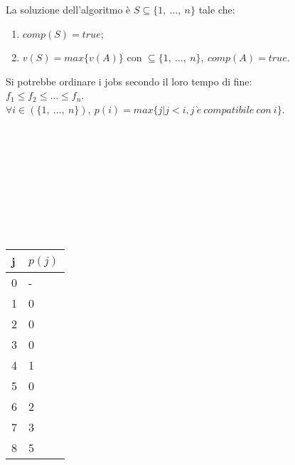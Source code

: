 La soluzione dell'algoritmo è $S \subseteq \{1,\ \dots,\ n\}$ tale che:
\begin{enumerate}
\item $comp(S) = true$;
\item $v(S) = max\{v(A)\}$ con $\subseteq \{1,\ \dots,\ n\},\ comp(A) = true$.
\end{enumerate}

Si potrebbe ordinare i jobs secondo il loro tempo di fine: \\
$f_1 \leq f_2 \leq \dots \leq f_n$. \\
$\forall i \in (\{1, \ \dots, \ n\}),\ p(i) = max\{j | j < i, j\ \grave{e}\ compatibile\ con\ i\}$.

\begin{minipage}{\textwidth}
    \begin{minipage}{0.75 \textwidth}
        \begin{ganttchart}{0}{12}
             \\
             \\
             \\
             \\
             \\
             \\
             \\
             \\
        \end{ganttchart}
    \end{minipage}
    \begin{minipage}{0.2 \textwidth}
        \begin{table}[H]
        \begin{tabular}{|l|l|}
        \hline
        j & $p(j)$ \\ \hline
        0 & -      \\ \hline
        1 & 0      \\ \hline
        2 & 0      \\ \hline
        3 & 0      \\ \hline
        4 & 1      \\ \hline
        5 & 0      \\ \hline
        6 & 2      \\ \hline
        7 & 3      \\ \hline
        8 & 5      \\ \hline
        \end{tabular}
        \end{table}
    \end{minipage}
\end{minipage}


